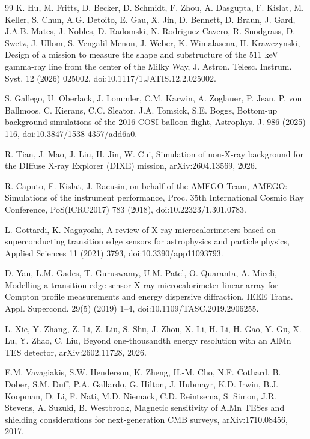 \documentclass[11pt]{article}
\begin{document}
\begin{thebibliography}{99}
K. Hu, M. Fritts, D. Becker, D. Schmidt, F. Zhou, A. Dasgupta, F. Kislat, M. Keller, S. Chun, A.G. Detoito, E. Gau, X. Jin, D. Bennett, D. Braun, J. Gard, J.A.B. Mates, J. Nobles, D. Radomski, N. Rodriguez Cavero, R. Snodgrass, D. Swetz, J. Ullom, S. Vengalil Menon, J. Weber, K. Wimalasena, H. Krawczynski, Design of a mission to measure the shape and substructure of the 511 keV gamma-ray line from the center of the Milky Way, J. Astron. Telesc. Instrum. Syst. 12 (2026) 025002, doi:10.1117/1.JATIS.12.2.025002.

S. Gallego, U. Oberlack, J. Lommler, C.M. Karwin, A. Zoglauer, P. Jean, P. von Ballmoos, C. Kierans, C.C. Sleator, J.A. Tomsick, S.E. Boggs, Bottom-up background simulations of the 2016 COSI balloon flight, Astrophys. J. 986 (2025) 116, doi:10.3847/1538-4357/add6a0.

R. Tian, J. Mao, J. Liu, H. Jin, W. Cui, Simulation of non-X-ray background for the DIffuse X-ray Explorer (DIXE) mission, arXiv:2604.13569, 2026.

R. Caputo, F. Kislat, J. Racusin, on behalf of the AMEGO Team, AMEGO: Simulations of the instrument performance, Proc. 35th International Cosmic Ray Conference, PoS(ICRC2017) 783 (2018), doi:10.22323/1.301.0783.

L. Gottardi, K. Nagayoshi, A review of X-ray microcalorimeters based on superconducting transition edge sensors for astrophysics and particle physics, Applied Sciences 11 (2021) 3793, doi:10.3390/app11093793.

D. Yan, L.M. Gades, T. Guruswamy, U.M. Patel, O. Quaranta, A. Miceli, Modelling a transition-edge sensor X-ray microcalorimeter linear array for Compton profile measurements and energy dispersive diffraction, IEEE Trans. Appl. Supercond. 29(5) (2019) 1--4, doi:10.1109/TASC.2019.2906255.

L. Xie, Y. Zhang, Z. Li, Z. Liu, S. Shu, J. Zhou, X. Li, H. Li, H. Gao, Y. Gu, X. Lu, Y. Zhao, C. Liu, Beyond one-thousandth energy resolution with an AlMn TES detector, arXiv:2602.11728, 2026.

E.M. Vavagiakis, S.W. Henderson, K. Zheng, H.-M. Cho, N.F. Cothard, B. Dober, S.M. Duff, P.A. Gallardo, G. Hilton, J. Hubmayr, K.D. Irwin, B.J. Koopman, D. Li, F. Nati, M.D. Niemack, C.D. Reintsema, S. Simon, J.R. Stevens, A. Suzuki, B. Westbrook, Magnetic sensitivity of AlMn TESes and shielding considerations for next-generation CMB surveys, arXiv:1710.08456, 2017.


\end{thebibliography}
\end{document}
